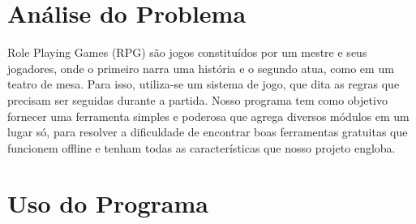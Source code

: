 \documentclass[
	article,			%
	11pt,				%
	oneside,			%
	a4paper,			%
	english,			%
	brazil,				%
	sumario=tradicional
	]{abntex2}
\begin{document}
\frenchspacing 


%
%
\maketitle





\textual


\section{Análise do Problema}

Role Playing Games (RPG) são jogos constituídos por um mestre e seus jogadores, onde o primeiro narra uma história e o segundo atua, como em um teatro de mesa. Para isso, utiliza-se um sistema de jogo, que dita as regras que precisam ser seguidas durante a partida. Nosso programa tem como objetivo fornecer uma ferramenta simples e poderosa que agrega diversos módulos em um lugar só, para resolver a dificuldade de encontrar boas ferramentas gratuitas que funcionem offline e tenham todas as características que nosso projeto engloba.

\section{Uso do Programa}
\end{document}
